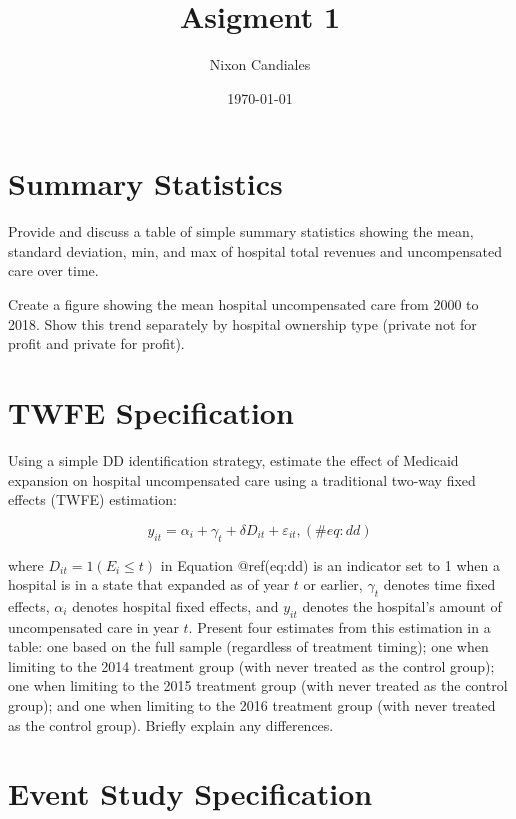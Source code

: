 \documentclass[
]{article}
\title{Asigment 1}
\author{Nixon Candiales}
\date{\today}
\begin{document}
\maketitle

\hypertarget{summary-statistics}{%
\section{Summary Statistics}\label{summary-statistics}}

Provide and discuss a table of simple summary statistics showing the
mean, standard deviation, min, and max of hospital total revenues and
uncompensated care over time.

Create a figure showing the mean hospital uncompensated care from 2000
to 2018. Show this trend separately by hospital ownership type (private
not for profit and private for profit).

\hypertarget{twfe-specification}{%
\section{TWFE Specification}\label{twfe-specification}}

Using a simple DD identification strategy, estimate the effect of
Medicaid expansion on hospital uncompensated care using a traditional
two-way fixed effects (TWFE) estimation:

\begin{equation}
y_{it} = \alpha_{i} + \gamma_{t} + \delta D_{it} + \varepsilon_{it},
(\#eq:dd)
\end{equation}

where \(D_{it}=1(E_{i}\leq t)\) in Equation @ref(eq:dd) is an indicator
set to 1 when a hospital is in a state that expanded as of year \(t\) or
earlier, \(\gamma_{t}\) denotes time fixed effects, \(\alpha_{i}\)
denotes hospital fixed effects, and \(y_{it}\) denotes the hospital's
amount of uncompensated care in year \(t\). Present four estimates from
this estimation in a table: one based on the full sample (regardless of
treatment timing); one when limiting to the 2014 treatment group (with
never treated as the control group); one when limiting to the 2015
treatment group (with never treated as the control group); and one when
limiting to the 2016 treatment group (with never treated as the control
group). Briefly explain any differences.

\hypertarget{event-study-specification}{%
\section{Event Study Specification}\label{event-study-specification}}
\end{document}
